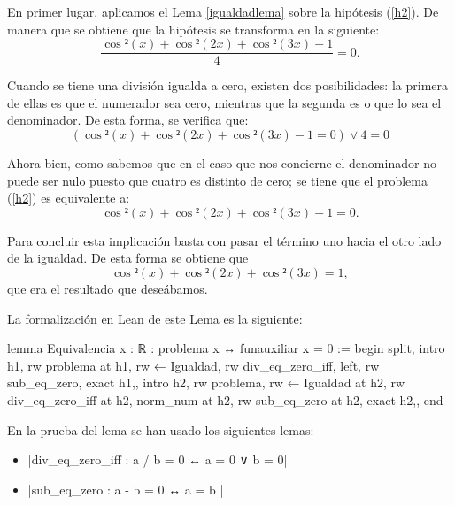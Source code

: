 \begin{demostracion}
  En primer lugar, aplicamos el Lema \ref{igualdadlema} sobre la
  hipótesis (\ref{h2}). De manera que se obtiene que la hipótesis
  se transforma en la siguiente:
  \begin{equation}
    \frac{\cos²(x)+\cos²(2x)+\cos²(3x)-1}{4}=0.
  \end{equation}
  
  Cuando se tiene una división igualda a cero, existen dos
  posibilidades: la primera de ellas es que el numerador sea
  cero, mientras que la segunda es o que lo sea el denominador.
  De esta forma, se verifica que:
  \begin{equation}
    (\cos²(x)+\cos²(2x)+\cos²(3x)-1=0) \lor 4=0
  \end{equation}

  Ahora bien, como sabemos que en el caso que nos concierne el
  denominador no puede ser nulo puesto que cuatro es distinto
  de cero; se tiene que el problema (\ref{h2}) es equivalente a:
  \begin{equation}
    \cos²(x)+\cos²(2x)+\cos²(3x)-1=0.
  \end{equation}

  Para concluir esta implicación basta con pasar el término uno
  hacia el otro lado de la igualdad. De esta forma se obtiene que
  \begin{equation}
    \cos²(x)+\cos²(2x)+\cos²(3x)=1,
  \end{equation}
  que era el resultado que deseábamos.
\end{demostracion}

La formalización en Lean de este Lema es la siguiente:
\begin{leancode}
lemma Equivalencia {x : ℝ} : problema x ↔ funauxiliar x = 0 :=
begin
  split,
  {intro h1,
  rw problema at h1,
  rw ← Igualdad,
  rw div_eq_zero_iff,
  left,
  rw sub_eq_zero,
  exact h1,},
  {intro h2,
  rw problema,
  rw ← Igualdad at h2,
  rw div_eq_zero_iff at h2,
  norm_num at h2,
  rw sub_eq_zero at h2,
  exact h2,},
end
\end{leancode}

En la prueba del lema se han usado los siguientes lemas:
\begin{itemize}
\item {}|div_eq_zero_iff : a / b = 0 ↔ a = 0 ∨ b = 0|
\item {}|sub_eq_zero : a - b = 0 ↔ a = b |
\end{itemize}

